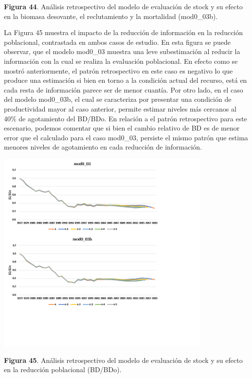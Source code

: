 \documentclass[
  spanish,
]{article}
\begin{document}
\small \textbf{Figura 44}. Análisis retrospectivo del modelo de
evaluación de stock y su efecto en la biomasa desovante, el
reclutamiento y la mortalidad (mod0\_03b). \vspace{0.5cm} \normalsize

La Figura 45 muestra el impacto de la reducción de información en la
reducción poblacional, contrastada en ambos casos de estudio. En esta
figura se puede observar, que el modelo mod0\_03 muestra una leve
subestimación al reducir la información con la cual se realiza la
evaluación poblacional. En efecto como se mostró anteriormente, el
patrón retrospectivo en este caso es negativo lo que produce una
estimación si bien en torno a la condición actual del recurso, está en
cada resta de información parece ser de menor cuantía. Por otro lado, en
el caso del modelo mod0\_03b, el cual se caracteriza por presentar una
condición de productividad mayor al caso anterior, permite estimar
niveles más cercanos al 40\% de agotamiento del BD/BDo. En relación a el
patrón retrospectivo para este escenario, podemos comentar que si bien
el cambio relativo de BD es de menor error que el calculado para el caso
mod0\_03, persiste el mismo patrón que estima menores niveles de
agotamiento en cada reducción de información.

\begin{center}
\includegraphics[width=0.8\textwidth]{Figuras/Figura_45.png}
\end{center}

\small \textbf{Figura 45}. Análisis retrospectivo del modelo de
evaluación de stock y su efecto en la reducción poblacional (BD/BDo).
\vspace{0.5cm} \normalsize
\end{document}
